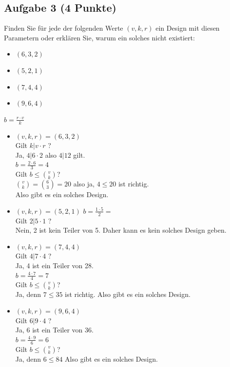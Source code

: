 \documentclass{article} %
\begin{document}
\subsection*{Aufgabe 3 (4 Punkte)}
Finden Sie für jede der folgenden Werte \( (v, k, r) \) ein Design mit diesen Parametern oder
erklären Sie, warum ein solches nicht existiert:
\begin{itemize}
    \item[(a)] \( (6, 3, 2) \)
    \item[(b)] \( (5, 2, 1) \)
    \item[(c)] \( (7, 4, 4) \)
    \item[(d)] \( (9, 6, 4) \)
\end{itemize}
\begin{mybox}
$b = \frac{r \cdot v}{k}$
\begin{itemize}
    \item[(a)] \((v, k, r) = (6, 3, 2) \) \\
    Gilt $k | v\cdot r$ ? \\
    Ja, $4 | 6\cdot 2$ also $4 | 12 $ gilt.  \\
    $b = \frac{2 \cdot 6}{3} = 4$ \\
    Gilt $b \leq \binom{v}{k}$? \\
    $
    \binom{v}{k} = \binom{6}{3} = 20
    $ also ja, $4 \leq 20$ ist richtig. \\
    Also gibt es ein solches Design. 
    \item[(b)] \((v, k, r) =  (5, 2, 1) \)
    $b = \frac{1 \cdot 5}{2} = $ \\
    Gilt $2 | 5\cdot 1$ ? \\
    Nein, 2 ist kein Teiler von 5. Daher kann es kein solches Design geben. 
    
    \item[(c)] \((v, k, r) =  (7, 4, 4) \) \\
    Gilt $4 | 7\cdot 4$ ? \\
    Ja, 4 ist ein Teiler von 28.  \\
    $b = \frac{4 \cdot 7}{4} = 7$ \\
    Gilt $b \leq \binom{v}{k}$? \\ 
    Ja, denn $7 \leq 35$ ist richtig. 
    Also gibt es ein solches Design. 
    
    \item[(d)] \((v, k, r) =  (9, 6, 4) \) \\
    Gilt $6 | 9\cdot 4$ ? \\ 
    Ja, 6 ist ein Teiler von 36. \\
    $b = \frac{4 \cdot 9}{6} = 6$ \\
     Gilt $b \leq \binom{v}{k}$? \\
     Ja, denn $6 \leq 84$
     Also gibt es ein solches Design. 
     
\end{itemize}
\end{mybox}
\end{document}
